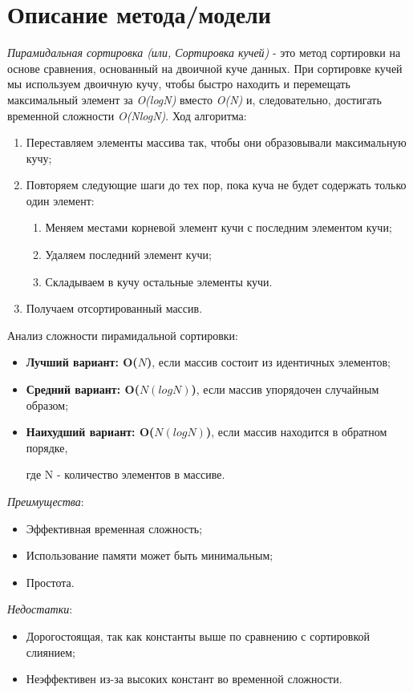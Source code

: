 \documentclass[12pt, a4paper]{report}
\begin{document}
	\section*{Описание метода/модели}
	\large
	\textit{Пирамидальная сортировка (или, Сортировка кучей)} - это метод сортировки на основе сравнения, основанный на двоичной куче данных. При сортировке кучей мы используем двоичную кучу, чтобы быстро находить и перемещать максимальный элемент за \textit{O(logN)} вместо \textit{O(N)} и, следовательно, достигать временной сложности \textit{O(NlogN)}.
	Ход алгоритма:
	\begin{enumerate}
		\item Переставляем элементы массива так, чтобы они образовывали максимальную кучу;
		\item Повторяем следующие шаги до тех пор, пока куча не будет содержать только один элемент:
		\begin{enumerate}
			\item Меняем местами корневой элемент кучи с последним элементом кучи;
			\item Удаляем последний элемент кучи;
			\item Складываем в кучу остальные элементы кучи.
		\end{enumerate}
		\item Получаем отсортированный массив.
	\end{enumerate}
	Анализ сложности пирамидальной сортировки:
	\begin{itemize}
		\item \textbf{Лучший вариант: O(\( N \))}, если массив состоит из идентичных элементов;
		\item \textbf{Средний вариант: O(\( N(logN) \))}, если массив упорядочен случайным образом;
		\item \textbf{Наихудший вариант: O(\( N(logN) \))}, если массив находится в обратном порядке, \par
		где N - количество элементов в массиве.
	\end{itemize}
	\textit{Преимущества}:
	\begin{itemize}
		\item Эффективная временная сложность;
		\item Использование памяти может быть минимальным;
		\item Простота.
	\end{itemize}
	\textit{Недостатки}:
	\begin{itemize}
		\item Дорогостоящая, так как константы выше по сравнению с сортировкой слиянием;
		\item Неэффективен из-за высоких констант во временной сложности.
	\end{itemize}
\end{document}
